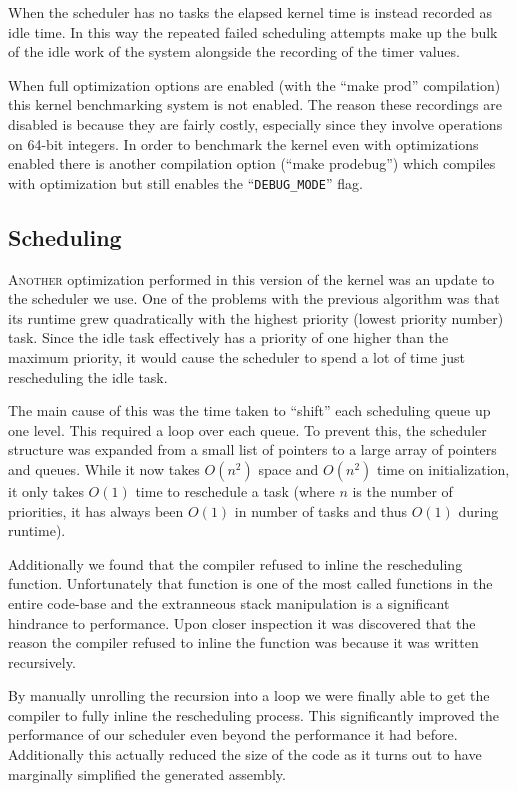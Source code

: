 \documentclass{article}
\begin{document}
When the scheduler has no tasks the elapsed kernel time is instead recorded as
idle time. In this way the repeated failed scheduling attempts make up the bulk
of the idle work of the system alongside the recording of the timer values.

When full optimization options are enabled (with the ``make prod'' compilation)
this kernel benchmarking system is not enabled. The reason these recordings are
disabled is because they are fairly costly, especially since they involve
operations on 64-bit integers. In order to benchmark the kernel even with
optimizations enabled there is another compilation option (``make prodebug'')
which compiles with optimization but still enables the ``\texttt{DEBUG\_MODE}''
flag.

\subsection*{Scheduling}

\textsc{Another} optimization performed in this version of the kernel was an
update to the scheduler we use. One of the problems with the previous algorithm
was that its runtime grew quadratically with the highest priority (lowest
priority number) task. Since the idle task effectively has a priority of one
higher than the maximum priority, it would cause the scheduler to spend a lot of
time just rescheduling the idle task.

The main cause of this was the time taken to ``shift'' each scheduling queue up
one level. This required a loop over each queue. To prevent this, the scheduler
structure was expanded from a small list of pointers to a large array of
pointers and queues. While it now takes $O(n^2)$ space and $O(n^2)$ time on
initialization, it only takes $O(1)$ time to reschedule a task (where $n$ is the
number of priorities, it has always been $O(1)$ in number of tasks and thus
$O(1)$ during runtime).

Additionally we found that the compiler refused to inline the rescheduling
function. Unfortunately that function is one of the most called functions in the
entire code-base and the extranneous stack manipulation is a significant
hindrance to performance. Upon closer inspection it was discovered that the
reason the compiler refused to inline the function was because it was written
recursively.

By manually unrolling the recursion into a loop we were finally able to get the
compiler to fully inline the rescheduling process. This significantly improved
the performance of our scheduler even beyond the performance it had before.
Additionally this actually reduced the size of the code as it turns out to have
marginally simplified the generated assembly.
\end{document}
